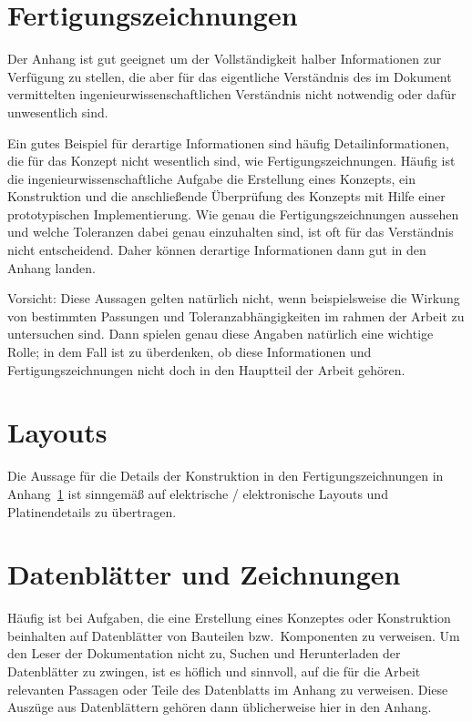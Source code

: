 \section{Fertigungszeichnungen}
\label{anh:fertigungszeichnungen}
Der Anhang ist gut geeignet um \glqq{}der Vollständigkeit halber\grqq{} Informationen zur Verfügung zu stellen, die aber für das eigentliche Verständnis des im Dokument vermittelten ingenieurwissenschaftlichen Verständnis nicht notwendig oder dafür unwesentlich sind. 

Ein gutes Beispiel für derartige Informationen sind häufig Detailinformationen, die für das Konzept nicht wesentlich sind, wie Fertigungszeichnungen. 
Häufig ist die ingenieurwissenschaftliche Aufgabe die Erstellung eines Konzepts, ein Konstruktion und die anschließende Überprüfung des Konzepts mit Hilfe einer prototypischen Implementierung. 
Wie genau die Fertigungszeichnungen aussehen und welche Toleranzen dabei genau einzuhalten sind, ist oft für das Verständnis nicht entscheidend. 
Daher können derartige Informationen dann gut in den Anhang landen. 

Vorsicht: Diese Aussagen gelten natürlich nicht, wenn beispielsweise die Wirkung von bestimmten Passungen und Toleranzabhängigkeiten im rahmen der Arbeit zu untersuchen sind. 
Dann spielen genau diese Angaben natürlich eine wichtige Rolle; in dem Fall ist zu überdenken, ob diese Informationen und Fertigungszeichnungen nicht doch in den Hauptteil der Arbeit gehören. 



\section{Layouts}
\label{anh:layouts}
Die Aussage für die Details der Konstruktion in den Fertigungszeichnungen in Anhang~\ref{anh:fertigungszeichnungen} ist sinngemäß auf elektrische / elektronische Layouts und Platinendetails zu übertragen. 


\section{Datenblätter und Zeichnungen}
\label{anh:datenblaetter}
%
Häufig ist bei Aufgaben, die eine Erstellung eines Konzeptes oder Konstruktion beinhalten auf Datenblätter von Bauteilen bzw.~Komponenten zu verweisen. 
Um den Leser der Dokumentation nicht zu, Suchen und Herunterladen der Datenblätter zu zwingen, ist es höflich und sinnvoll, auf die für die Arbeit relevanten Passagen oder Teile des Datenblatts im Anhang zu verweisen. 
Diese Auszüge aus Datenblättern gehören dann üblicherweise hier in den Anhang.


